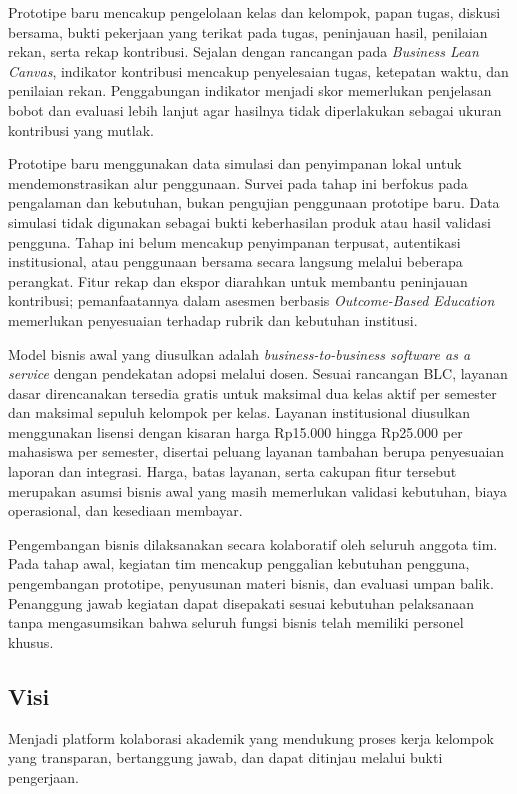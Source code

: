 \documentclass[12pt,a4paper,oneside]{report}
\begin{document}
Prototipe baru mencakup pengelolaan kelas dan kelompok, papan tugas, diskusi bersama, bukti pekerjaan yang terikat pada tugas, peninjauan hasil, penilaian rekan, serta rekap kontribusi. Sejalan dengan rancangan pada \textit{Business Lean Canvas}, indikator kontribusi mencakup penyelesaian tugas, ketepatan waktu, dan penilaian rekan. Penggabungan indikator menjadi skor memerlukan penjelasan bobot dan evaluasi lebih lanjut agar hasilnya tidak diperlakukan sebagai ukuran kontribusi yang mutlak.

Prototipe baru menggunakan data simulasi dan penyimpanan lokal untuk mendemonstrasikan alur penggunaan. Survei pada tahap ini berfokus pada pengalaman dan kebutuhan, bukan pengujian penggunaan prototipe baru. Data simulasi tidak digunakan sebagai bukti keberhasilan produk atau hasil validasi pengguna. Tahap ini belum mencakup penyimpanan terpusat, autentikasi institusional, atau penggunaan bersama secara langsung melalui beberapa perangkat. Fitur rekap dan ekspor diarahkan untuk membantu peninjauan kontribusi; pemanfaatannya dalam asesmen berbasis \textit{Outcome-Based Education} memerlukan penyesuaian terhadap rubrik dan kebutuhan institusi.

Model bisnis awal yang diusulkan adalah \textit{business-to-business software as a service} dengan pendekatan adopsi melalui dosen. Sesuai rancangan BLC, layanan dasar direncanakan tersedia gratis untuk maksimal dua kelas aktif per semester dan maksimal sepuluh kelompok per kelas. Layanan institusional diusulkan menggunakan lisensi dengan kisaran harga Rp15.000 hingga Rp25.000 per mahasiswa per semester, disertai peluang layanan tambahan berupa penyesuaian laporan dan integrasi. Harga, batas layanan, serta cakupan fitur tersebut merupakan asumsi bisnis awal yang masih memerlukan validasi kebutuhan, biaya operasional, dan kesediaan membayar.

Pengembangan bisnis dilaksanakan secara kolaboratif oleh seluruh anggota tim. Pada tahap awal, kegiatan tim mencakup penggalian kebutuhan pengguna, pengembangan prototipe, penyusunan materi bisnis, dan evaluasi umpan balik. Penanggung jawab kegiatan dapat disepakati sesuai kebutuhan pelaksanaan tanpa mengasumsikan bahwa seluruh fungsi bisnis telah memiliki personel khusus.

\subsection{Visi}
Menjadi platform kolaborasi akademik yang mendukung proses kerja kelompok yang transparan, bertanggung jawab, dan dapat ditinjau melalui bukti pengerjaan.
\end{document}
